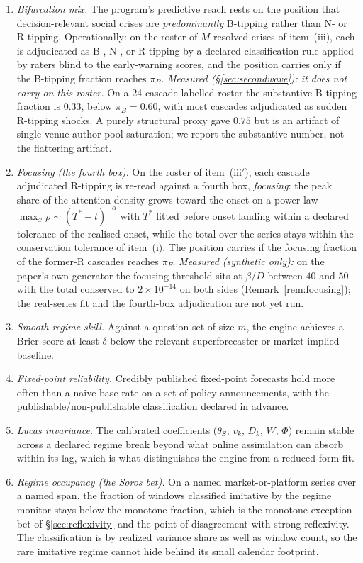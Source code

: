 \documentclass[11pt]{article}
\begin{document}
\begin{enumerate}[label=(\roman*),itemsep=2pt]
\item[(iii$'$)] \emph{Bifurcation mix.} The program's predictive reach rests on the position that decision-relevant social crises are \emph{predominantly} B-tipping rather than N- or R-tipping. Operationally: on the roster of $M$ resolved crises of item~(iii), each is adjudicated as B-, N-, or R-tipping by a declared classification rule applied by raters blind to the early-warning scores, and the position carries only if the B-tipping fraction reaches $\pi_B$. \emph{Measured (\S\ref{sec:secondwave}): it does not carry on this roster.} On a 24-cascade labelled roster the substantive B-tipping fraction is $0.33$, below $\pi_B=0.60$, with most cascades adjudicated as sudden R-tipping shocks. A purely structural proxy gave $0.75$ but is an artifact of single-venue author-pool saturation; we report the substantive number, not the flattering artifact.
\item[(iii$''$)] \emph{Focusing (the fourth box).} On the roster of item~(iii$'$), each cascade adjudicated R-tipping is re-read against a fourth box, \emph{focusing}: the peak share of the attention density grows toward the onset on a power law $\max_x\rho\sim(T^\ast-t)^{-\alpha}$ with $T^\ast$ fitted before onset landing within a declared tolerance of the realised onset, while the total over the series stays within the conservation tolerance of item~(i). The position carries if the focusing fraction of the former-R cascades reaches $\pi_F$. \emph{Measured (synthetic only):} on the paper's own generator the focusing threshold sits at $\beta/D$ between $40$ and $50$ with the total conserved to $2\times10^{-14}$ on both sides (Remark~\ref{rem:focusing}); the real-series fit and the fourth-box adjudication are not yet run.
\item \emph{Smooth-regime skill.} Against a question set of size $m$, the engine achieves a Brier score at least $\delta$ below the relevant superforecaster or market-implied baseline.
\item \emph{Fixed-point reliability.} Credibly published fixed-point forecasts hold more often than a naive base rate on a set of policy announcements, with the publishable/non-publishable classification declared in advance.
\item \emph{Lucas invariance.} The calibrated coefficients ($\theta_S$, $v_k$, $D_k$, $W$, $\Phi$) remain stable across a declared regime break beyond what online assimilation can absorb within its lag, which is what distinguishes the engine from a reduced-form fit.
\item \emph{Regime occupancy (the Soros bet).} On a named market-or-platform series over a named span, the fraction of windows classified imitative by the regime monitor stays below the monotone fraction, which is the monotone-exception bet of \S\ref{sec:reflexivity} and the point of disagreement with strong reflexivity. The classification is by realized variance share as well as window count, so the rare imitative regime cannot hide behind its small calendar footprint.
\end{enumerate}
\end{document}
